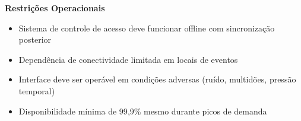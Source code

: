 \textbf{Restrições Operacionais}
\begin{itemize}
    \item Sistema de controle de acesso deve funcionar offline com sincronização posterior
    \item Dependência de conectividade limitada em locais de eventos
    \item Interface deve ser operável em condições adversas (ruído, multidões, pressão temporal)
    \item Disponibilidade mínima de 99{,}9\% mesmo durante picos de demanda
\end{itemize}
